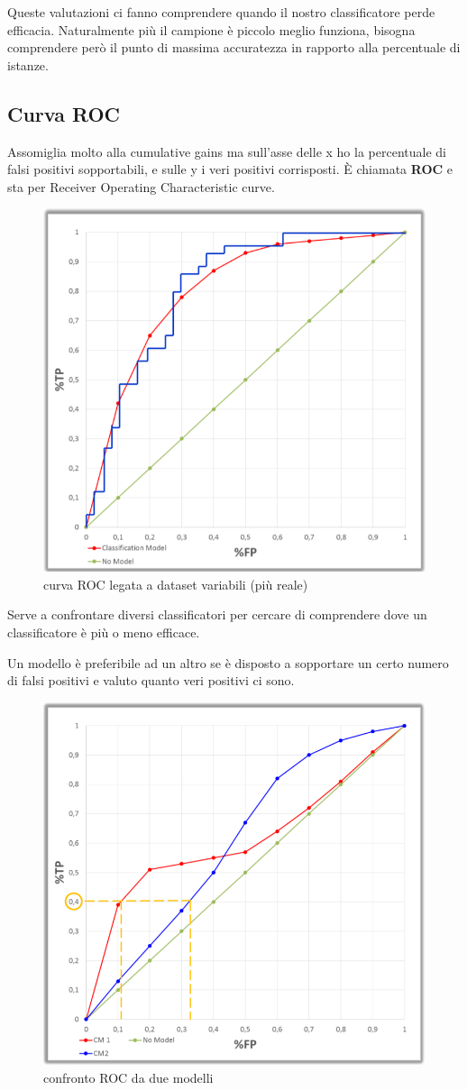 Queste valutazioni ci fanno comprendere quando il nostro classificatore perde efficacia. Naturalmente pi\`u il campione \`e piccolo meglio funziona, bisogna comprendere per\`o il punto di massima accuratezza in rapporto alla percentuale di istanze.

\subsection{Curva ROC}
Assomiglia molto alla cumulative gains ma sull'asse delle x ho la percentuale di falsi positivi sopportabili, e sulle y i veri positivi corrisposti. \`E chiamata \textbf{ROC} e sta per Receiver Operating Characteristic curve. 
\begin{figure}[h!]
	\centering
	\includegraphics[height=0.6 \linewidth]{pict/roc.png}
	\caption{curva ROC legata a dataset variabili (pi\`u reale)}
\end{figure}
Serve a confrontare diversi classificatori per cercare di comprendere dove un classificatore \`e pi\`u o meno efficace. 

Un modello \`e preferibile ad un altro se \`e disposto a sopportare un certo numero di falsi positivi e valuto quanto veri positivi ci sono. 

\begin{figure}[h!]
	\centering
	\includegraphics[height=0.6 \linewidth]{pict/roc_confronto.png}
	\caption{confronto ROC da due modelli}
\end{figure}
\clearpage
